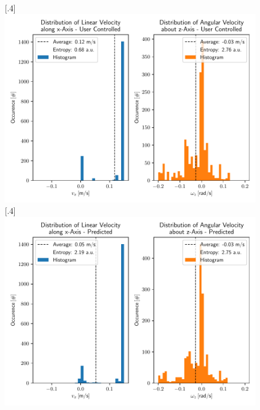 \begin{figure}[h]
	\centering
	\subcaptionbox{}%
	[.4\linewidth]{\includegraphics[scale=.35]{chapters/05_experiments/04_autonomous_walking/user_entropy_at_epoch_40.pdf}}
	\subcaptionbox{}%
	[.4\linewidth]{\includegraphics[scale=.35]{chapters/05_experiments/04_autonomous_walking/predicted_entropy_at_epoch_40.pdf}}
	\caption{}
	\label{fig::542_training_dist}
\end{figure}
